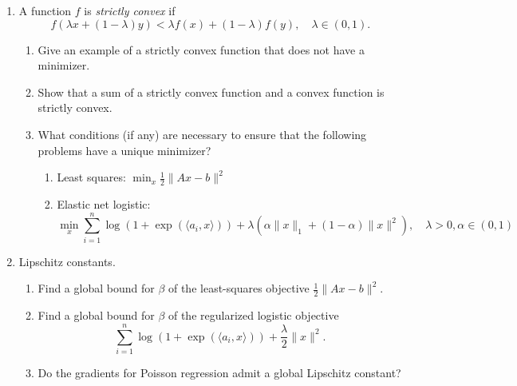 \documentclass[11pt]{amsart}
\begin{document}
\begin{enumerate}
\item A function $f$ is {\it strictly convex} if 
\[
f(\lambda x + (1-\lambda)y) < \lambda f(x) + (1-\lambda) f(y), \quad \lambda \in (0,1).
\]
\begin{enumerate}
\item Give an example of a strictly convex function that 
does not have a minimizer. 
\item Show that a sum of a strictly convex function and a convex function is strictly convex. 
\item What conditions (if any) are necessary to ensure that the following problems have a unique minimizer?  
\begin{enumerate}
\item Least squares: $\min_x \frac{1}{2}\|Ax - b\|^2$
\item Elastic net logistic: 
\[
\min_x \sum_{i=1}^n \log(1 + \exp(\langle a_i, x\rangle)) + \lambda(\alpha \|x\|_1 + (1-\alpha)\|x\|^2), \quad \lambda>0, \alpha \in (0,1)
\]
\end{enumerate}
\end{enumerate}
\bigskip\bigskip



\item Lipschitz constants.  
\begin{enumerate}
\item Find a global bound for $\beta$ of the least-squares objective $\frac{1}{2}\|Ax-b\|^2$.
\item Find a global bound for $\beta$ of the regularized logistic objective 
\[
\sum_{i=1}^n \log(1+\exp(\langle a_i, x\rangle)) + \frac{\lambda}{2}\|x\|^2. 
\]
\item Do the gradients for Poisson regression admit a global Lipschitz constant? 
\end{enumerate}



\bigskip\bigskip


\end{enumerate}
\end{document}
